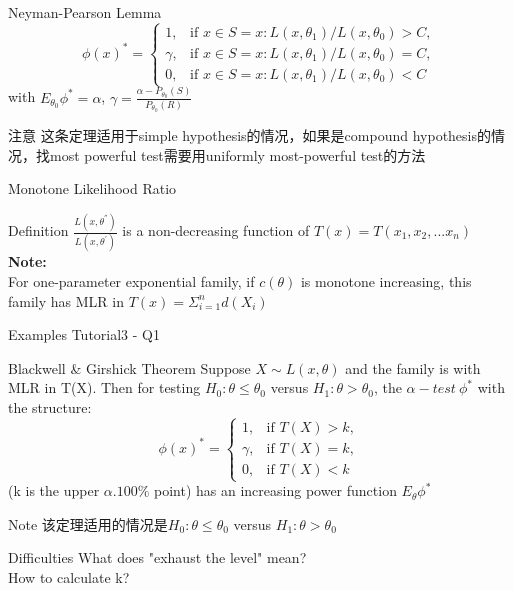 \documentclass{beamer}
\begin{document}
    \begin{frame}{Neyman-Pearson Lemma}
        \[
        \phi(x)^*= 
        \begin{cases}
            1,&\text{if } x \in S = {x:L(x,\theta_1)/L(x,\theta_0) > C},\\
            \gamma, &\text{if } x \in S = {x:L(x,\theta_1)/L(x,\theta_0) = C},\\
            0,&\text{if } x \in S = {x:L(x,\theta_1)/L(x,\theta_0) < C}
        \end{cases}
        \]
        with $E_{\theta_0}\phi^*=\alpha$, $\gamma=\frac{\alpha-P_{\theta_0}(S)}{P_{\theta_0}(R)}$
        \begin{block}{注意}
        这条定理适用于simple hypothesis的情况，如果是compound hypothesis的情况，找most powerful test需要用uniformly most-powerful test的方法
        \end{block}
    \end{frame}
    
    \begin{frame}{Monotone Likelihood Ratio}
        \begin{block}{Definition}
            $\frac{L(x,\theta^{''})}{L(x,\theta^{'})}$ is a non-decreasing function of $T(x)=T(x_1,x_2,...x_n)$\\
            \textbf{Note:}\\
            For one-parameter exponential family, if $c(\theta)$ is monotone increasing, this family has MLR in $T(x)=\Sigma_{i=1}^{n}d(X_i)$
        \end{block}
        
        \begin{exampleblock}{Examples}
            Tutorial3 - Q1
        \end{exampleblock}
    \end{frame}
    
    \begin{frame}{Blackwell \& Girshick Theorem}
    Suppose $X \sim L(x,\theta)$ and the family is with MLR in T(X). Then for testing $H_0:\theta \leq \theta_0$ versus $H_1:\theta > \theta_0$, the $\alpha-test\ \phi^*$ with the structure:
        \[
        \phi(x)^*= 
        \begin{cases}
            1,&\text{if } T(X) > k,\\
            \gamma, &\text{if } T(X) = k,\\
            0,&\text{if } T(X) < k
        \end{cases}
        \]
    (k is the upper $\alpha.100\%$ point) has an increasing power function $E_{\theta}\phi^*$
        \begin{alertblock}{Note}
            该定理适用的情况是$H_0:\theta \leq \theta_0$ versus $H_1: \theta > \theta_0$
        \end{alertblock}
        \begin{block}{Difficulties}
            What does "exhaust the level" mean?\\
            How to calculate k?
        \end{block}
    \end{frame}
    
\end{document}
